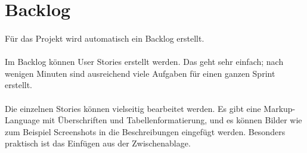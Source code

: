 \documentclass{article}
\begin{document}
\begin{figure}[h]
  \centering
  \label{pname}
\end{figure}

\pagebreak

\section{Backlog}
\paragraph{}
Für das Projekt wird automatisch ein Backlog erstellt.

\begin{figure}[h]
  \centering
  \label{backlog}
\end{figure}

\paragraph{}
Im Backlog können User Stories erstellt werden. Das geht sehr einfach; nach wenigen Minuten sind ausreichend viele Aufgaben für einen ganzen Sprint erstellt.

\paragraph{}
Die einzelnen Stories können vielseitig bearbeitet werden. Es gibt eine Markup-Language mit Überschriften und Tabellenformatierung, und es können Bilder wie zum Beispiel Screenshots in die Beschreibungen eingefügt werden. Besonders praktisch ist das Einfügen aus der Zwischenablage.
\end{document}
